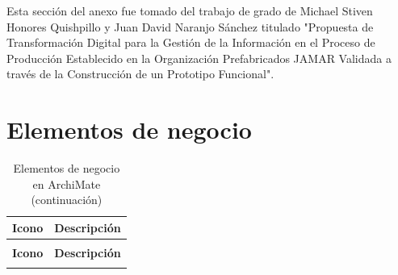 \noindent
Esta sección del anexo fue tomado del trabajo de grado de Michael Stiven Honores Quishpillo y Juan David Naranjo Sánchez titulado "Propuesta de Transformación Digital para la Gestión de la Información en el Proceso de Producción Establecido en la Organización Prefabricados JAMAR Validada a través de la Construcción de un Prototipo Funcional".

\section{Elementos de negocio}

\begin{longtable}{|c|p{8cm}|}
	\caption{Elementos de negocio en ArchiMate} \label{tab:elementos-negocio-archimate}                                                  \\
	\hline
	\tableheader
	\textbf{Icono}                                                                     & \textbf{Descripción}                            \\
	\hline
	\endfirsthead

	\caption[]{Elementos de negocio en ArchiMate (continuación)}                                                                         \\
	\hline
	\tableheader
	\textbf{Icono}                                                                     & \textbf{Descripción}                            \\
	\hline
	\endhead

	\hline
	\endfoot


\end{longtable}
